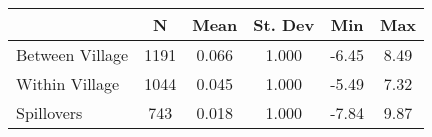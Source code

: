 \begin{tabular}{l*{5}{c}}\hline&\multicolumn{1}{c}{N}&\multicolumn{1}{c}{Mean}&\multicolumn{1}{c}{St. Dev}&\multicolumn{1}{c}{Min}&\multicolumn{1}{c}{Max}\\ \hline 
Between Village & 1191 & 0.066 & 1.000 & -6.45 & 8.49 \\
Within Village & 1044 & 0.045 & 1.000 & -5.49 & 7.32 \\
Spillovers & 743 & 0.018 & 1.000 & -7.84 & 9.87 \\
\hline \end{tabular}
